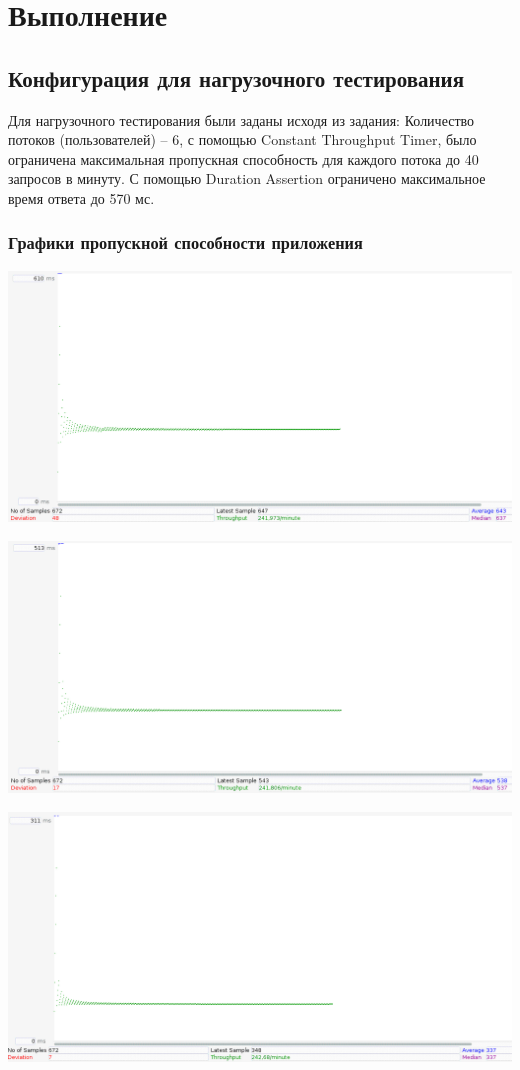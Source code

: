 \section{Выполнение}
\subsection{Конфигурация для нагрузочного тестирования}
Для нагрузочного тестирования были заданы исходя из задания:
Количество потоков (пользователей) -- 6, с помощью Constant Throughput Timer,
было ограничена максимальная пропускная способность для каждого потока до
40 запросов в минуту. С помощью Duration Assertion ограничено максимальное
время ответа до 570 мс.
\subsubsection{Графики пропускной способности приложения}

\includegraphics[width=500bp]{img/conf1_graph.png}

\includegraphics[width=500bp]{img/conf2_graph.png}

\includegraphics[width=500bp]{img/conf3_graph.png}

